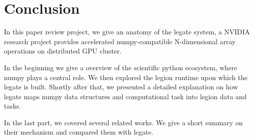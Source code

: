 \documentclass{article}
\newenvironment{newSecNoNP}[1]{
	\section{#1}
	\lhead{#1}
}{}
\begin{document}
\begin{newSecNoNP}{Conclusion}
	In this paper review project, we give an anatomy of the legate system, a NVIDIA research project provides accelerated numpy-compatible N-dimensional array operations on distributed GPU cluster.\par
	In the beginning we give a overview of the scientific python ecosystem, where numpy plays a central role.
	We then explored the legion runtime upon which the legate is built.
	Shortly after that, we presented a detailed explanation on how legate maps numpy data structures and computational task into legion data and tasks.\par
	In the last part, we covered several related works.
	We give a short summary on their mechanism and compared them with legate.
\end{newSecNoNP}
\printbibliography
\appendix


\end{document}

